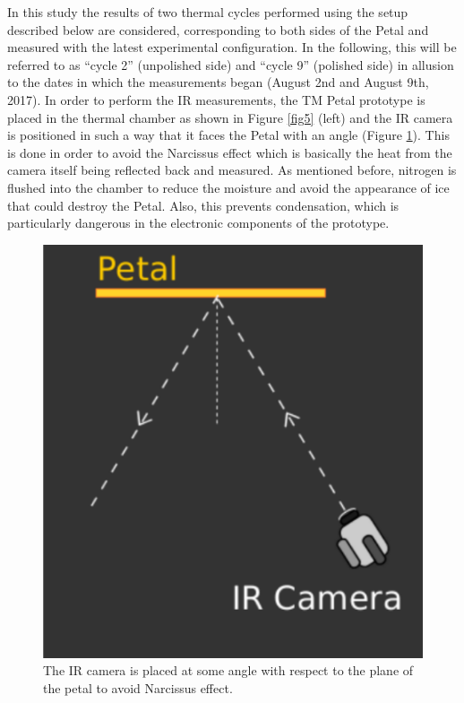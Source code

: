 		In this study the results of two thermal cycles performed using the setup described below are considered, corresponding to both sides of the Petal and measured with the latest experimental configuration. In the following, this will be referred to as “cycle 2” (unpolished side) and “cycle 9” (polished side) in allusion to the dates in which the measurements began (August 2nd and August 9th, 2017). 
		In order to perform the IR measurements, the TM Petal prototype is placed in the thermal chamber as shown in Figure \ref{fig5} (left) and the IR camera is positioned in such a way that it faces the Petal with an angle (Figure \ref{fig10}). This is done in order to avoid the Narcissus effect which is basically the heat from the camera itself being reflected back and measured.
		As mentioned before, nitrogen is flushed into the chamber to reduce the moisture and avoid the appearance of ice that could destroy the Petal. Also, this prevents condensation, which is particularly dangerous in the electronic components of the prototype.
		
		\begin{figure}[ht!]
			\centering
			\captionsetup{justification=centering,margin=2cm}
			\includegraphics[scale=0.35]{Figures/Chapter02/NarcissusEffect.pdf}
			\caption{\label{fig10} The IR camera is placed at some angle with respect to the plane of the petal to avoid Narcissus effect.}
		\end{figure}
		
